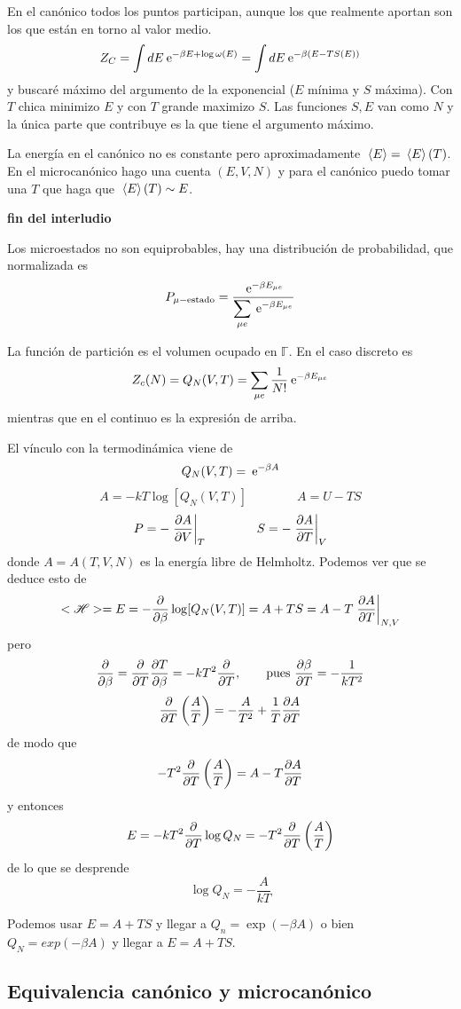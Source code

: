 \documentclass[10pt,oneside]{CBFT_book}
\begin{document}
En el canónico todos los puntos participan, aunque los que realmente aportan son los que están en torno
al valor medio.
\[
	Z_C = \int dE \:\mathrm{e}^{-\beta E + \log \omega(E)} =
	\int dE \:\mathrm{e}^{-\beta ( E - TS(E)) }
\]
y buscaré máximo del argumento de la exponencial ($E$ mínima y $S$ máxima). Con $T$ chica minimizo $E$ y
con $T$ grande maximizo $S$.
Las funciones $S,E$ van como $N$ y la única parte que contribuye es la que tiene el argumento máximo.

La energía en el canónico no es constante pero aproximadamente $ \:\left\langle E \right\rangle = \:\left\langle E \right\rangle(T) $. En el microcanónico
hago una cuenta $(E,V,N)$  y para el canónico puedo tomar una $T$ que haga que $ \:\left\langle E \right\rangle(T) \sim E$.

{\bf fin del interludio}

Los microestados no son equiprobables, hay una distribución de probabilidad, que normalizada es
\[
	P_{\mu-\text{estado}} = \frac{ \:\mathrm{e}^{-\beta E_{\mu e}} }{ \displaystyle \sum_{\mu e} \:\mathrm{e}^{-\beta E_{\mu e}} }
\]

La función de partición es el volumen ocupado en $\mathbb{\Gamma}$. En el caso discreto es
\[
	Z_c(N) = Q_N(V,T) = \sum_{\mu e} \frac{1}{N!} \:\mathrm{e}^{-\beta E_{\mu e}}
\]
mientras que en el continuo es la expresión de arriba.


El vínculo con la termodinámica viene de
\[
	Q_N(V,T) = \:\mathrm{e}^{-\beta A}
\]
\[
	A = -kT\log [Q_N(V,T)] \qquad \qquad A = U - TS
\]
\[
	P = -\left.\frac{\partial^{\hspace{-0.05em}} {A}}{\partial {V}^{\hspace{-0.05em}}}\right|_{T} \qquad \qquad S = -\left.\frac{\partial^{\hspace{-0.05em}} {A}}{\partial {T}^{\hspace{-0.05em}}}\right|_{V}
\]
donde $A=A(T,V,N)$ es la energía libre de Helmholtz. Podemos ver que se deduce esto de 
\[
	< \mathscr{H} > = E = -\frac{\partial^{\hspace{-0.05em}} {}}{\partial {\beta}^{\hspace{-0.05em}}} \log [ Q_N(V,T) ] = A + TS = A - T\left.\frac{\partial^{\hspace{-0.05em}} {A}}{\partial {T}^{\hspace{-0.05em}}}\right|_{N,V}
\]
pero 
\[
	\frac{\partial^{\hspace{-0.05em}} {}}{\partial {\beta}^{\hspace{-0.05em}}} = \frac{\partial^{\hspace{-0.05em}} {}}{\partial {T}^{\hspace{-0.05em}}} \frac{\partial^{\hspace{-0.05em}} {T}}{\partial {\beta}^{\hspace{-0.05em}}} = -k T^2 \frac{\partial^{\hspace{-0.05em}} {}}{\partial {T}^{\hspace{-0.05em}}}, \qquad \text{pues } \frac{\partial^{\hspace{-0.05em}} {\beta}}{\partial {T}^{\hspace{-0.05em}}} = - 
	\frac{1}{kT^2}
\]
\[
	\frac{\partial^{\hspace{-0.05em}} {}}{\partial {T}^{\hspace{-0.05em}}}\left( \frac{A}{T} \right) = -\frac{A}{T^2} + \frac{1}{T}\frac{\partial^{\hspace{-0.05em}} {A}}{\partial {T}^{\hspace{-0.05em}}}
\]
de modo que 
\[
	-T^2 \frac{\partial^{\hspace{-0.05em}} {}}{\partial {T}^{\hspace{-0.05em}}}\left( \frac{A}{T} \right) = A - T \frac{\partial^{\hspace{-0.05em}} {A}}{\partial {T}^{\hspace{-0.05em}}}
\]
y entonces
\[
	E = -k T^2 \frac{\partial^{\hspace{-0.05em}} {}}{\partial {T}^{\hspace{-0.05em}}}\log Q_N = -T^2 \frac{\partial^{\hspace{-0.05em}} {}}{\partial {T}^{\hspace{-0.05em}}}\left( \frac{A}{T} \right) 
\]
de lo que se desprende
\[
	\log Q_N = -\frac{A}{kT}
\]

Podemos usar $E=A+TS$ y llegar a $Q_n=\exp(-\beta A)$ o bien $Q_N=exp(-\beta A)$ y llegar a $E=A+TS$.

\subsection{Equivalencia canónico y microcanónico}
\end{document}
